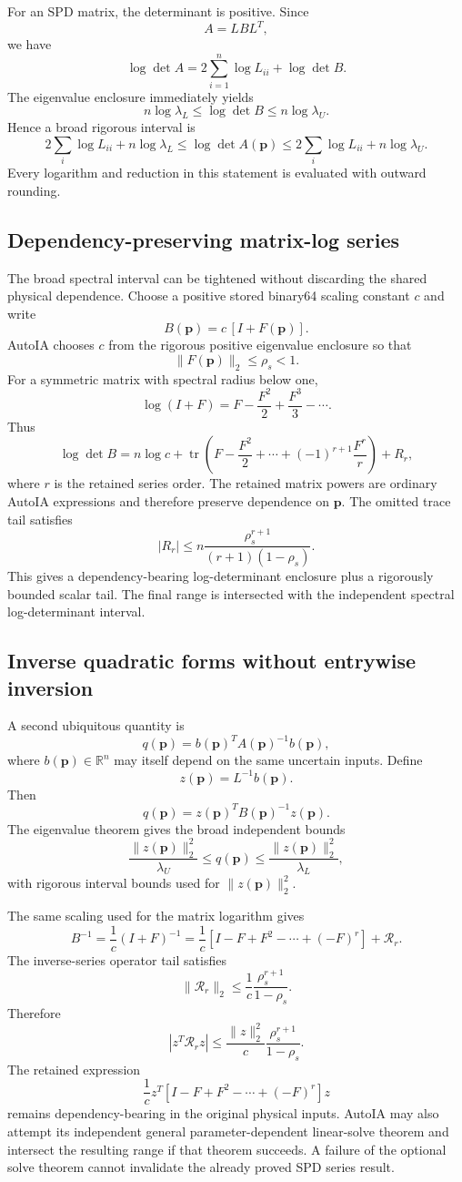 \documentclass[11pt]{article}
\newcommand{\R}{\mathbb{R}}
\newcommand{\pv}{\mathbf{p}}
\begin{document}
For an SPD matrix, the determinant is positive.  Since
\[
  A=L B L^T,
\]
we have
\[
  \log\det A
  =2\sum_{i=1}^n\log L_{ii}+\log\det B.
\]
The eigenvalue enclosure immediately yields
\[
  n\log\lambda_L
  \le
  \log\det B
  \le
  n\log\lambda_U.
\]
Hence a broad rigorous interval is
\[
  \boxed{
  2\sum_i\log L_{ii}+n\log\lambda_L
  \le
  \log\det A(\pv)
  \le
  2\sum_i\log L_{ii}+n\log\lambda_U.
  }
\]
Every logarithm and reduction in this statement is evaluated with outward
rounding.

\subsection{Dependency-preserving matrix-log series}

The broad spectral interval can be tightened without discarding the shared
physical dependence.  Choose a positive stored binary64 scaling constant
\(c\) and write
\[
  B(\pv)=c\,[I+F(\pv)].
\]
AutoIA chooses \(c\) from the rigorous positive eigenvalue enclosure so that
\[
  \|F(\pv)\|_2\le\rho_s<1.
\]
For a symmetric matrix with spectral radius below one,
\[
  \log(I+F)
  =F-\frac{F^2}{2}+\frac{F^3}{3}-\cdots.
\]
Thus
\[
  \log\det B
  =n\log c
  +\operatorname{tr}\left(
  F-\frac{F^2}{2}+\cdots+(-1)^{r+1}\frac{F^r}{r}
  \right)+R_r,
\]
where \(r\) is the retained series order.  The retained matrix powers are
ordinary AutoIA expressions and therefore preserve dependence on \(\pv\).  The
omitted trace tail satisfies
\[
  |R_r|
  \le
  n\frac{\rho_s^{r+1}}{(r+1)(1-\rho_s)}.
\]
This gives a dependency-bearing log-determinant enclosure plus a rigorously
bounded scalar tail.  The final range is intersected with the independent
spectral log-determinant interval.

\subsection{Inverse quadratic forms without entrywise inversion}

A second ubiquitous quantity is
\[
  q(\pv)=b(\pv)^T A(\pv)^{-1}b(\pv),
\]
where \(b(\pv)\in\R^n\) may itself depend on the same uncertain inputs.  Define
\[
  z(\pv)=L^{-1}b(\pv).
\]
Then
\[
  q(\pv)=z(\pv)^T B(\pv)^{-1}z(\pv).
\]
The eigenvalue theorem gives the broad independent bounds
\[
  \boxed{
  \frac{\|z(\pv)\|_2^2}{\lambda_U}
  \le q(\pv)\le
  \frac{\|z(\pv)\|_2^2}{\lambda_L},
  }
\]
with rigorous interval bounds used for \(\|z(\pv)\|_2^2\).

The same scaling used for the matrix logarithm gives
\[
  B^{-1}=\frac{1}{c}(I+F)^{-1}
  =\frac{1}{c}\left[I-F+F^2-\cdots+(-F)^r\right]+\mathcal{R}_r.
\]
The inverse-series operator tail satisfies
\[
  \|\mathcal{R}_r\|_2
  \le
  \frac{1}{c}\frac{\rho_s^{r+1}}{1-\rho_s}.
\]
Therefore
\[
  \left|
  z^T\mathcal{R}_r z
  \right|
  \le
  \frac{\|z\|_2^2}{c}
  \frac{\rho_s^{r+1}}{1-\rho_s}.
\]
The retained expression
\[
  \frac{1}{c}z^T
  \left[I-F+F^2-\cdots+(-F)^r\right]z
\]
remains dependency-bearing in the original physical inputs.  AutoIA may also
attempt its independent general parameter-dependent linear-solve theorem and
intersect the resulting range if that theorem succeeds.  A failure of the
optional solve theorem cannot invalidate the already proved SPD series result.
\end{document}
